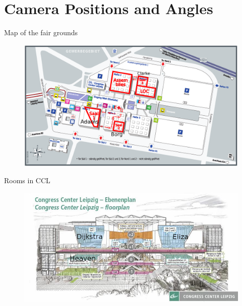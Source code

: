 \documentclass[aspectratio=169]{beamer}
\begin{document}
\section{Camera Positions and Angles}
\begin{frame}{Map of the fair grounds}
	\begin{figure} 
		\centering
		\includegraphics[height=0.9\textheight]{images/planmessegelaende_rotelinien.png}
	\end{figure}
\end{frame}

\begin{frame}{Rooms in CCL}
	\begin{figure} 
		\centering
		\includegraphics[height=0.9\textheight]{images/congress_center_leipzig_querschnitt.jpg}
	\end{figure}
\end{frame}
\end{document}
